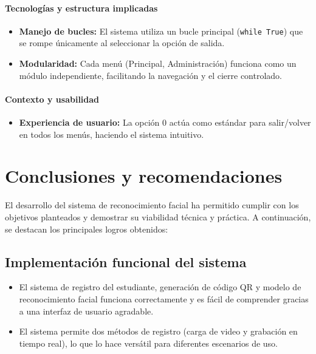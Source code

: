 \documentclass[12pt]{article}
\begin{document}
{\paragraph{Tecnologías y estructura implicadas}
\begin{itemize}
    \item \textbf{Manejo de bucles:} El sistema utiliza un bucle principal (\texttt{while True}) que se rompe únicamente al seleccionar la opción de salida.
    \item \textbf{Modularidad:} Cada menú (Principal, Administración) funciona como un módulo independiente, facilitando la navegación y el cierre controlado.
\end{itemize}

\paragraph{Contexto y usabilidad}
\begin{itemize}
    \item \textbf{Experiencia de usuario:} La opción 0 actúa como estándar para salir/volver en todos los menús, haciendo el sistema intuitivo.
\end{itemize}

\section{Conclusiones y recomendaciones}

El desarrollo del sistema de reconocimiento facial ha permitido cumplir con los objetivos planteados y demostrar su viabilidad técnica y práctica. A continuación, se destacan los principales logros obtenidos:

\subsection*{Implementación funcional del sistema}
\begin{itemize}
    \item El sistema de registro del estudiante, generación de código QR y modelo de reconocimiento facial funciona correctamente y es fácil de comprender gracias a una interfaz de usuario agradable.
    \item El sistema permite dos métodos de registro (carga de video y grabación en tiempo real), lo que lo hace versátil para diferentes escenarios de uso.
\end{itemize}

}
\end{document}
